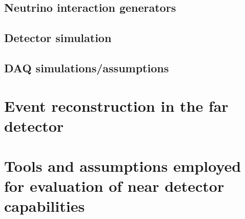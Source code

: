 \subsection{Neutrino interaction generators} 
\label{sec:tools-mc-gen}


\subsection{Detector simulation}
\label{sec:tools-mc-detsim}

\subsection{DAQ simulations/assumptions}
\label{sec:tools-mc-daq}


\section{Event reconstruction in the far detector}
\label{sec:tools-fdreco}


\section{Tools and assumptions employed for evaluation of near detector capabilities}
\label{sec:tools-nd-eval}



